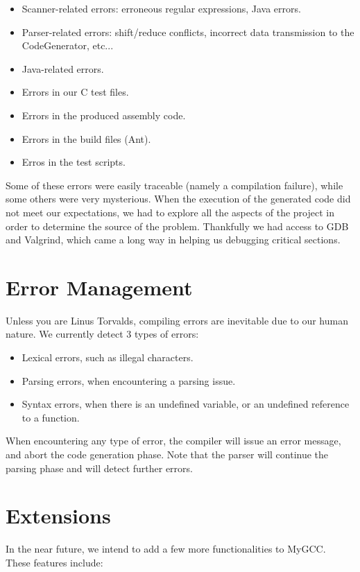 \documentclass{scrartcl}
\begin{document}
\begin{itemize}
\item Scanner-related errors: erroneous regular expressions, Java errors.
\item Parser-related errors: shift/reduce conflicts, incorrect data transmission to the CodeGenerator, etc...
\item Java-related errors.
\item Errors in our C test files.
\item Errors in the produced assembly code.
\item Errors in the build files (Ant).
\item Erros in the test scripts.
\end{itemize}

Some of these errors were easily traceable (namely a compilation failure), while some others were very mysterious. When the execution of the generated code did not meet our expectations, we had to explore all the aspects of the project in order to determine the source of the problem. Thankfully we had access to GDB and Valgrind, which came a long way in helping us debugging critical sections.\\


\section{Error Management}
Unless you are Linus Torvalds, compiling errors are inevitable due to our human nature. We currently detect 3 types of errors:

\begin{itemize}
\item Lexical errors, such as illegal characters.
\item Parsing errors, when encountering a parsing issue.
\item Syntax errors, when there is an undefined variable, or an undefined reference to a function.
\end{itemize}

When encountering any type of error, the compiler will issue an error message, and abort the code generation phase. Note that the parser will continue the parsing phase and will detect further errors.

\section{Extensions}
In the near future, we intend to add a few more functionalities to MyGCC.\\
These features include:
\end{document}
